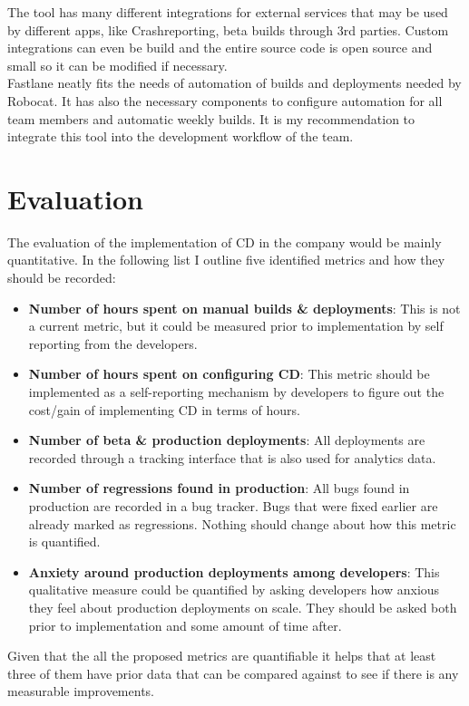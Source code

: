 \documentclass{ituthesis}
\begin{document}
The tool has many different integrations for external services that may be used by different apps, like Crashreporting, beta builds through 3rd parties. Custom integrations can even be build and the entire source code is open source and small so it can be modified if necessary.\\

Fastlane neatly fits the needs of automation of builds and deployments needed by Robocat. It has also the necessary components to configure automation for all team members and automatic weekly builds. It is my recommendation to integrate this tool into the development workflow of the team.

\chapter{Evaluation}
\label{ch:evaluation}

The evaluation of the implementation of CD in the company would be mainly quantitative. In the following list I outline five identified metrics and how they should be recorded:

\begin{itemize}
	\item \textbf{Number of hours spent on manual builds \& deployments}: This is not a current metric, but it could be measured prior to implementation by self reporting from the developers.
	\item \textbf{Number of hours spent on configuring CD}: This metric should be implemented as a self-reporting mechanism by developers to figure out the cost/gain of implementing CD in terms of hours.
	\item \textbf{Number of beta \& production deployments}: All deployments are recorded through a tracking interface that is also used for analytics data.
	\item \textbf{Number of regressions found in production}: All bugs found in production are recorded in a bug tracker. Bugs that were fixed earlier are already marked as regressions. Nothing should change about how this metric is quantified.
	\item \textbf{Anxiety around production deployments among developers}: This qualitative measure could be quantified by asking developers how anxious they feel about production deployments on scale. They should be asked both prior to implementation and some amount of time after.
\end{itemize}

Given that the all the proposed metrics are quantifiable it helps that at least three of them have prior data that can be compared against to see if there is any measurable improvements.
\end{document}

